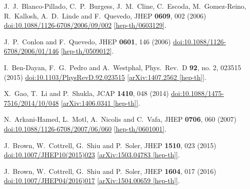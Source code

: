\documentclass[12pt]{article}
\begin{document}
\begin{thebibliography}{99}
  J.~J.~Blanco-Pillado, C.~P.~Burgess, J.~M.~Cline, C.~Escoda, M.~Gomez-Reino, R.~Kallosh, A.~D.~Linde and F.~Quevedo,
  JHEP {\bf 0609}, 002 (2006)
  \href{https://dx.doi.org/10.1088/1126-6708/2006/09/002}{doi:10.1088/1126-6708/2006/09/002}
  \href{https://arxiv.org/abs/hep-th/0603129}{[hep-th/0603129]}.

  J.~P.~Conlon and F.~Quevedo,
  JHEP {\bf 0601}, 146 (2006)
  \href{https://dx.doi.org/10.1088/1126-6708/2006/01/146}{doi:10.1088/1126-6708/2006/01/146}
  \href{https://arxiv.org/abs/hep-th/0509012}{[hep-th/0509012]}.

  I.~Ben-Dayan, F.~G.~Pedro and A.~Westphal,
  Phys.\ Rev.\ D {\bf 92}, no. 2, 023515 (2015)
  \href{https://dx.doi.org/10.1103/PhysRevD.92.023515}{doi:10.1103/PhysRevD.92.023515}
  \href{https://arxiv.org/abs/1407.2562}{[arXiv:1407.2562 [hep-th]]}.

  X.~Gao, T.~Li and P.~Shukla,
  JCAP {\bf 1410}, 048 (2014)
  \href{https://dx.doi.org/10.1088/1475-7516/2014/10/048}{doi:10.1088/1475-7516/2014/10/048}
  \href{https://arxiv.org/abs/1406.0341}{[arXiv:1406.0341 [hep-th]]}.

  N.~Arkani-Hamed, L.~Motl, A.~Nicolis and C.~Vafa,
  JHEP {\bf 0706}, 060 (2007)
  \href{https://dx.doi.org/10.1088/1126-6708/2007/06/060}{doi:10.1088/1126-6708/2007/06/060}
  \href{https://arxiv.org/abs/hep-th/0601001}{[hep-th/0601001]}.

  J.~Brown, W.~Cottrell, G.~Shiu and P.~Soler,
  JHEP {\bf 1510}, 023 (2015)
  \href{https://dx.doi.org/10.1007/JHEP10(2015)023}{doi:10.1007/JHEP10(2015)023}
  \href{https://arxiv.org/abs/1503.04783}{[arXiv:1503.04783 [hep-th]]}.

  J.~Brown, W.~Cottrell, G.~Shiu and P.~Soler,
  JHEP {\bf 1604}, 017 (2016)
  \href{https://dx.doi.org/10.1007/JHEP04(2016)017}{doi:10.1007/JHEP04(2016)017}
  \href{https://arxiv.org/abs/1504.00659}{[arXiv:1504.00659 [hep-th]]}.


\end{thebibliography}
\end{document}
